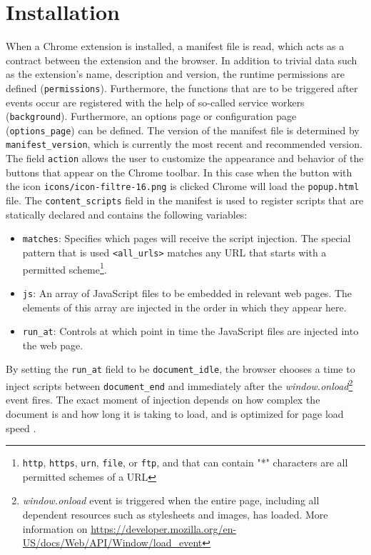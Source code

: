 \section{Installation}
When a Chrome extension is installed, a manifest file is read, which acts as a contract between the extension and the browser. In addition to trivial data such as the extension's name, description and version, the runtime permissions are defined (\texttt{permissions}). Furthermore, the functions that are to be triggered after events occur are registered with the help of so-called service workers (\texttt{background}). Furthermore, an options page or configuration page (\verb;options_page;) can be defined. The version of the manifest file is determined by \verb;manifest_version;, which is currently the most recent and recommended version. The field \texttt{action} allows the user to customize the appearance and behavior of the buttons that appear on the Chrome toolbar. In this case when the button with the icon \texttt{icons/icon-filtre-16.png} is clicked Chrome will load the \texttt{popup.html} file. The \verb;content_scripts; field in the manifest is used to register scripts that are statically declared and contains the following variables:

\begin{itemize}
  \item \texttt{matches}: Specifies which pages will receive the script injection. The special pattern that is used \verb;<all_urls>; matches any URL that starts with a permitted scheme\footnote{\texttt{http}, \texttt{https}, \texttt{urn}, \texttt{file}, or \texttt{ftp}, and that can contain "*" characters are all permitted schemes of a URL}.
  \item \texttt{js}: An array of JavaScript files to be embedded in relevant web pages. The elements of this array are injected in the order in which they appear here.
  \item \verb;run_at;: Controls at which point in time the JavaScript files are injected into the web page.
\end{itemize}

By setting the \verb;run_at; field to be \verb;document_idle;, the browser chooses a time to inject scripts between \verb;document_end; and immediately after the \emph{window.onload}\footnote{\emph{window.onload} event is triggered when the entire page, including all dependent resources such as stylesheets and images, has loaded. More information on \url{https://developer.mozilla.org/en-US/docs/Web/API/Window/load_event}} event fires. The exact moment of injection depends on how complex the document is and how long it is taking to load, and is optimized for page load speed \autocite{chrome2021runtime}.

